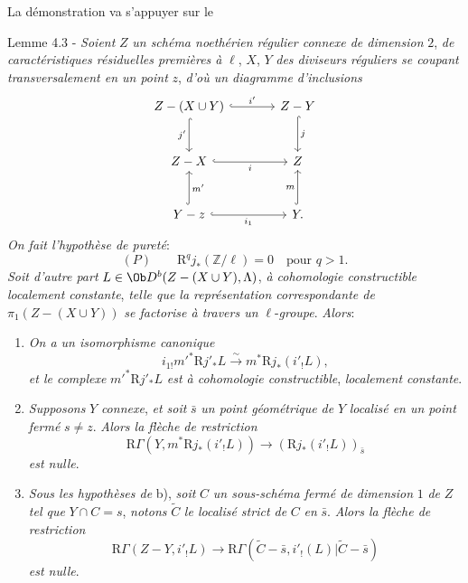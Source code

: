 La démonstration va s'appuyer sur le

\begin{statement}{Lemme 4.3 -}
\emph{Soient} $Z$ \emph{un schéma noethérien régulier connexe de dimension} $2$, \emph{de caractéristiques résiduelles premières à} $\ell$, $X$, $Y$ \emph{des diviseurs réguliers se coupant transversalement en un point} $z$, \emph{d'où un diagramme d'inclusions}
\[
\begin{tikzcd}[column sep=large,row sep=large]
Z-(X\cup Y) \arrow[r,hook,"i'"] \arrow[d,hook,"j'"'] & Z-Y \arrow[d,hook,"j"]\\
Z-X \arrow[r,hook,"i"'] & Z\\
Y-z \arrow[r,hook,"i_1"'] \arrow[u,hook,"m'"'] & Y \arrow[u,hook,"m"] .
\end{tikzcd}
\]
\emph{On fait l'hypothèse de pureté}:
\[
(P)\qquad \mathrm{R}^qj_*(\mathbb{Z}/\ell)=0\quad\text{pour }q>1.
\]
\emph{Soit d'autre part} $L\in\Ob D^b(Z-(X\cup Y),\Lambda)$, \emph{à cohomologie constructible localement constante}, \emph{telle que la représentation correspondante de} $\pi_1(Z-(X\cup Y))$ \emph{se factorise à travers un} $\ell$-\emph{groupe}. \emph{Alors}:
\begin{enumerate}[label=\alph*)]
\item \emph{On a un isomorphisme canonique}
\[
i_{1!}m'^*\mathrm{R} j'_*L\xrightarrow{\sim} m^*\mathrm{R} j_*(i'_!L),
\]
\emph{et le complexe} $m'^*\mathrm{R} j'_*L$ \emph{est à cohomologie constructible}, \emph{localement constante}.
\item \emph{Supposons} $Y$ \emph{connexe}, \emph{et soit} $\bar s$ \emph{un point géométrique de} $Y$ \emph{localisé en un point fermé} $s\ne z$. \emph{Alors la flèche de restriction}
\begin{equation}
\mathrm{R}\Gamma(Y,m^*\mathrm{R} j_*(i'_!L))\longrightarrow (\mathrm{R} j_*(i'_!L))_{\bar s}
\tag{4.3.1}
\end{equation}
\emph{est nulle}.
\item \emph{Sous les hypothèses de} b), \emph{soit} $C$ \emph{un sous-schéma fermé de dimension} $1$ \emph{de} $Z$ \emph{tel que} $Y\cap C=s$, \emph{notons} $\widetilde C$ \emph{le localisé strict de} $C$ \emph{en} $\bar s$. \emph{Alors la flèche de restriction}
\begin{equation}
\mathrm{R}\Gamma(Z-Y,i'_!L)
\longrightarrow
\mathrm{R}\Gamma(\widetilde C-\bar s,i'_!(L)|\widetilde C-\bar s)
\tag{4.3.2}
\end{equation}
\emph{est nulle}.
\end{enumerate}
\end{statement}

